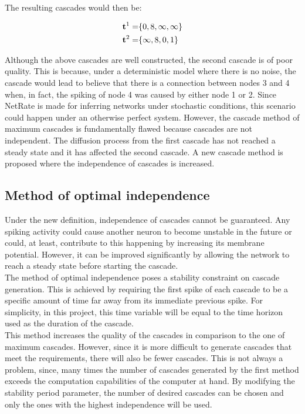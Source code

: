 The resulting cascades would then be:

\begin{align}
	\centering
	\textbf{t}^{1} = &\{0, 8, \infty, \infty \}\\
	\textbf{t}^{2} = &\{\infty, 8, 0, 1 \}
\end{align}

Although the above cascades are well constructed, the second cascade is of poor quality. This is because, under a deterministic model where there is no noise, the cascade would lead to believe that there is a connection between nodes 3 and 4 when, in fact, the spiking of node 4 was caused by either node 1 or 2. Since NetRate is made for inferring networks under stochastic conditions, this scenario could happen under an otherwise perfect system. However, the cascade method of maximum cascades is fundamentally flawed because cascades are not independent. The diffusion process from the first cascade has not reached a steady state and it has affected the second cascade. A new cascade method is proposed where the independence of cascades is increased. 



\subsection{Method of optimal independence}\label{sec:optimal_independence}

Under the new definition, independence of cascades cannot be guaranteed. Any spiking activity could cause another neuron to become unstable in the future or could, at least, contribute to this happening by increasing its membrane potential. However, it can be improved significantly by allowing the network to reach a steady state before starting the cascade.\\

The method of optimal independence poses a stability constraint on cascade generation. This is achieved by requiring the first spike of each cascade to be a specific amount of time far away from its immediate previous spike. For simplicity, in this project, this time variable will be equal to the time horizon used as the duration of the cascade.\\

This method increases the quality of the cascades in comparison to the one of maximum cascades. However, since it is more difficult to generate cascades that meet the requirements, there will also be fewer cascades. This is not always a problem, since, many times the number of cascades generated by the first method exceeds the computation capabilities of the computer at hand. By modifying the stability period parameter, the number of desired cascades can be chosen and only the ones with the highest independence will be used.

